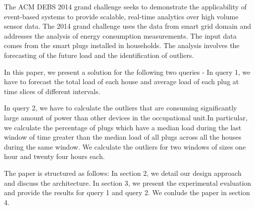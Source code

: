 
The ACM DEBS 2014 grand challenge seeks to demonstrate the applicability of event-based systems to provide scalable, real-time analytics over high volume sensor data. The 2014 grand challenge uses the data from smart grid domain and addresses the analysis of energy consumption measurements. The input data comes from the smart plugs installed in households. The analysis involves the forecasting of the future load and the identification of outliers.

In this paper, we present a solution for the following two queries -
In query 1, we have to forecast the total load of each house and average load of each plug at time slices of different intervals.

In query 2, we have to calculate the outliers that are consuming significantly large amount of power than other devices in the occupational unit.In particular, we calculate the percentage of plugs which have a median load during the last window of time greater than the median load of all plugs across all the houses during the same window. We calculate the outliers for two windows of sizes one hour and twenty four hours each.

The paper is structured as follows: In section 2, we detail our design approach and discuss the architecture. In section 3, we present the experimental evaluation and provide the results for query 1 and query 2. We conlude the paper in section 4.
